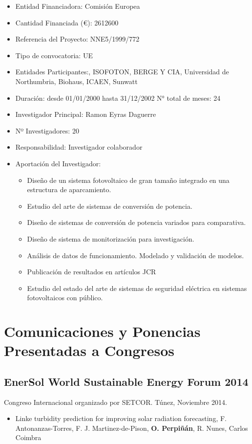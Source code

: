 \documentclass[article, a4paper]{memoir}
\begin{document}
\begin{itemize}
\item Entidad Financiadora: Comisión Europea
\item Cantidad Financiada (€): 2612600
\item Referencia del Proyecto: NNE5/1999/772
\item Tipo de convocatoria: UE
\item Entidades Participantes:, ISOFOTON, BERGE Y CIA, Universidad de Northumbria, Biohaus, ICAEN, Sunwatt
\item Duración: desde 01/01/2000 hasta 31/12/2002 N° total de meses: 24
\item Investigador Principal: Ramon Eyras Daguerre
\item Nº Investigadores: 20
\item Responsabilidad: Investigador colaborador
\item Aportación del Investigador:
\begin{itemize}
\item Diseño de un sistema fotovoltaico de gran tamaño integrado en una estructura de aparcamiento.
\item Estudio del arte de sistemas de conversión de potencia.
\item Diseño de sistemas de conversión de potencia variados para comparativa.
\item Diseño de sistema de monitorización para investigación.
\item Análisis de datos de funcionamiento. Modelado y validación de modelos.
\item Publicación de resultados en artículos JCR
\item Estudio del estado del arte de sistemas de seguridad eléctrica en sistemas fotovoltaicos con público.
\end{itemize}
\end{itemize}


\section{Comunicaciones y Ponencias Presentadas a Congresos}
\label{sec-9}
\subsection{EnerSol World Sustainable Energy Forum 2014}
\label{sec-9-1}
Congreso Internacional organizado por SETCOR. Túnez, Noviembre 2014.

\begin{itemize}
\item Linke turbidity prediction for improving solar radiation forecasting, F. Antonanzas-Torres, F. J. Martinez-de-Pison, \textbf{O. Perpiñán}, R. Nunes, Carlos Coimbra
\end{itemize}
\end{document}
